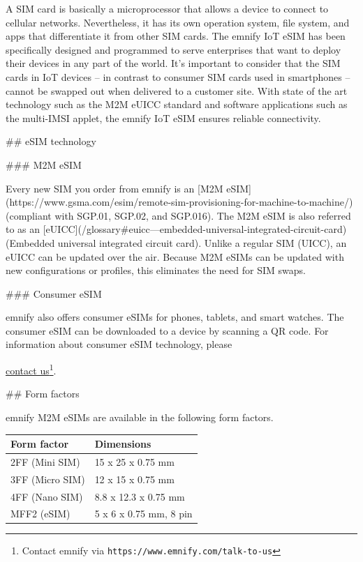 \documentclass[11pt, oneside]{article}   	%
\begin{document}
\begin{markdown}

A SIM card is basically a microprocessor that allows a device to connect to cellular networks. Nevertheless, it has its own operation system, file system, and apps that differentiate it from other SIM cards. 
The emnify IoT eSIM has been specifically designed and programmed to serve enterprises that want to deploy their devices in any part of the world.
It's important to consider that the SIM cards in IoT devices -- in contrast to consumer SIM cards used in smartphones -- cannot be swapped out when delivered to a customer site. 
With state of the art technology such as the M2M eUICC standard and software applications such as the multi-IMSI applet, the emnify IoT eSIM ensures reliable connectivity. 

## eSIM technology

### M2M eSIM

Every new SIM you order from emnify is an [M2M eSIM](https://www.gsma.com/esim/remote-sim-provisioning-for-machine-to-machine/) (compliant with SGP.01, SGP.02, and SGP.016).
The M2M eSIM is also referred to as an [eUICC](/glossary#euicc---embedded-universal-integrated-circuit-card) (Embedded universal integrated circuit card).
Unlike a regular SIM (UICC), an eUICC can be updated over the air.
Because M2M eSIMs can be updated with new configurations or profiles, this eliminates the need for SIM swaps.

### Consumer eSIM

emnify also offers consumer eSIMs for phones, tablets, and smart watches.
The consumer eSIM can be downloaded to a device by scanning a QR code.
For information about consumer eSIM technology, please 
\end{markdown}
\href{https://www.emnify.com/talk-to-us}{contact us}\footnote{Contact emnify via \texttt{https://www.emnify.com/talk-to-us}}.

\pagebreak[4]

\begin{markdown}

## Form factors

\end{markdown}

emnify M2M eSIMs are available in the following form factors.

\begin{table}[H]
\begin{tabular}{|l|l|}
\hline
\textbf{Form factor} & \textbf{Dimensions} \\ \hline
2FF (Mini SIM) & 15 x 25 x 0.75 mm \\ \hline
3FF (Micro SIM) & 12 x 15 x 0.75 mm \\ \hline
4FF (Nano SIM) & 8.8 x 12.3 x 0.75 mm \\ \hline
MFF2 (eSIM) & 5 x 6 x 0.75 mm, 8 pin \\ \hline
\end{tabular}%
\end{table}
\end{document}
